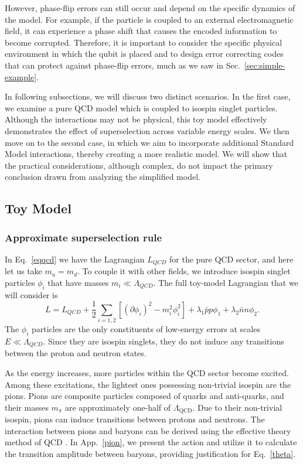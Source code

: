 \documentclass[11pt,english]{article}
\newcommand{\Sec}[1]{Sec.~\ref{#1}}
\newcommand{\App}[1]{App.~\ref{#1}}
\begin{document}
However, phase-flip errors can still occur and depend on the specific dynamics of the model. For example, if the particle is coupled to an external electromagnetic field, it can experience a phase shift that causes the encoded information to become corrupted. Therefore, it is important to consider the specific physical environment in which the qubit is placed and to design error correcting codes that can protect against phase-flip errors, much as we saw in \Sec{sec:simple-example}. 

In following subsections, we will discuss two distinct scenarios.  In the first case,  we examine a pure QCD model which is coupled to isospin singlet particles.  Although the interactions may not be physical, this toy model effectively demonstrates the effect of superselection across variable energy scales.   We then move on to the second case, in which we aim to incorporate additional Standard Model interactions, thereby creating a more realistic model. We will show that the practical considerations, although complex, do not impact the primary conclusion drawn from analyzing the simplified model.



\subsection{Toy Model}
\subsubsection*{Approximate superselection rule}
In  Eq.~\eqref{eqqcd} we have the Lagrangian $L_{QCD}$ for the pure QCD sector, and here let us take $m_u=m_d$. To couple it with other fields, we introduce isospin singlet particles $\phi_i$ that have masses $m_i\ll \Lambda_{QCD}$. The full toy-model Lagrangian that we will consider is
\begin{equation}
    L=L_{QCD}+\frac1 2\sum_{i=1,2}[(\partial \phi_i)^2-m_i^2\phi_i^2]+ 
     \lambda_1 \bar{p}p\phi_1+\lambda_2\bar{n}n \phi_2.
\end{equation}
The $\phi_i$ particles are the only constituents of low-energy errors at scales $E\ll \Lambda_{QCD}$. Since they are isospin singlets, they do not induce any transitions between the proton and neutron states. 

As the energy increases, more particles within the QCD sector become excited. Among these excitations, the lightest ones possessing non-trivial isospin are the pions. Pions are composite particles composed of quarks and anti-quarks, and their masses $m_{\pi}$ are approximately one-half of $\Lambda_{\text{QCD}}$. Due to their non-trivial isospin, pions can induce transitions between protons and neutrons. The interaction between pions and baryons can be derived using the effective theory method of QCD \cite{ecker1994pionnucleon,GASSER1984142,SCHWINGER1957407}. In \App{pion}, we present the action and utilize it to calculate the transition amplitude between baryons, providing justification for Eq.~\eqref{theta}.
\end{document}
